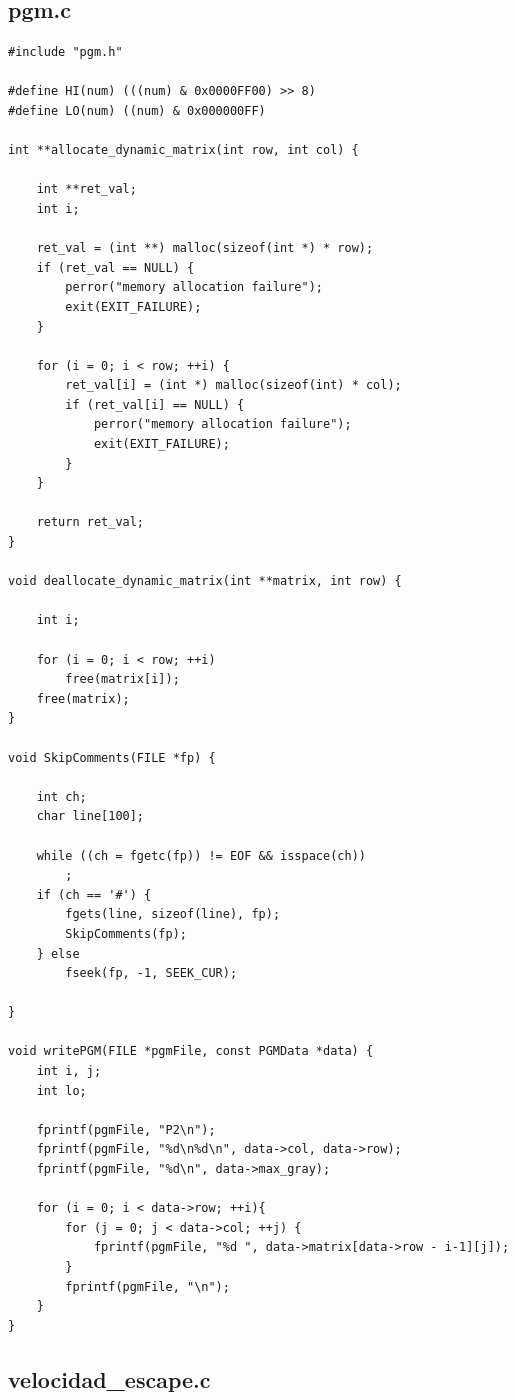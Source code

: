 \documentclass[a4paper,10pt]{article}
\begin{document}
\subsection{pgm.c}

\begin{verbatim}
#include "pgm.h"

#define HI(num)	(((num) & 0x0000FF00) >> 8)
#define LO(num)	((num) & 0x000000FF)

int **allocate_dynamic_matrix(int row, int col) {

	int **ret_val;
	int i;

	ret_val = (int **) malloc(sizeof(int *) * row);
	if (ret_val == NULL) {
		perror("memory allocation failure");
		exit(EXIT_FAILURE);
	}

	for (i = 0; i < row; ++i) {
		ret_val[i] = (int *) malloc(sizeof(int) * col);
		if (ret_val[i] == NULL) {
			perror("memory allocation failure");
			exit(EXIT_FAILURE);
		}
	}

	return ret_val;
}

void deallocate_dynamic_matrix(int **matrix, int row) {

	int i;

	for (i = 0; i < row; ++i)
		free(matrix[i]);
	free(matrix);
}

void SkipComments(FILE *fp) {

	int ch;
	char line[100];

	while ((ch = fgetc(fp)) != EOF && isspace(ch))
		;
	if (ch == '#') {
		fgets(line, sizeof(line), fp);
		SkipComments(fp);
	} else
		fseek(fp, -1, SEEK_CUR);

}

void writePGM(FILE *pgmFile, const PGMData *data) {
	int i, j;
	int lo;

	fprintf(pgmFile, "P2\n");
	fprintf(pgmFile, "%d\n%d\n", data->col, data->row);
	fprintf(pgmFile, "%d\n", data->max_gray);

	for (i = 0; i < data->row; ++i){
		for (j = 0; j < data->col; ++j) {
            fprintf(pgmFile, "%d ", data->matrix[data->row - i-1][j]);
		}
		fprintf(pgmFile, "\n");
	}
}

\end{verbatim}
\pagebreak

\subsection{velocidad\_escape.c}
\end{document}
